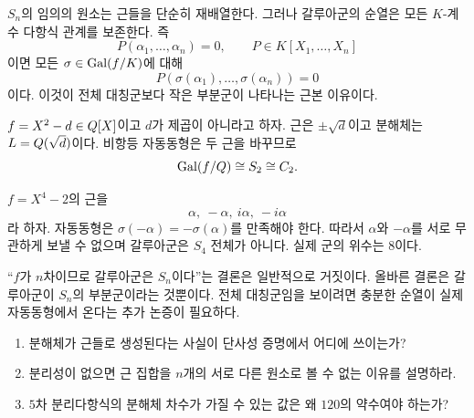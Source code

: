 \begin{remark}
$S_n$의 임의의 원소는 근들을 단순히 재배열한다. 그러나 갈루아군의 순열은 모든 $K$-계수 다항식 관계를 보존한다. 즉
\[
  P(\alpha_1,\dots,\alpha_n)=0,
  \qquad P\in K[X_1,\dots,X_n]
\]
이면 모든 $\sigma\in\operatorname{Gal}(f/K)$에 대해
\[
  P(\sigma(\alpha_1),\dots,\sigma(\alpha_n))=0
\]
이다. 이것이 전체 대칭군보다 작은 부분군이 나타나는 근본 이유이다.
\end{remark}

\begin{example}[이차방정식]
$f=X^2-d\in Q[X]$이고 $d$가 제곱이 아니라고 하자. 근은 $\pm\sqrt d$이고 분해체는 $L=Q(\sqrt d)$이다. 비항등 자동동형은 두 근을 바꾸므로
\[
  \operatorname{Gal}(f/Q)\cong S_2\cong C_2.
\]
\end{example}

\begin{example}
$f=X^4-2$의 근을
\[
  \alpha,\ -\alpha,\ i\alpha,\ -i\alpha
\]
라 하자. 자동동형은 $\sigma(-\alpha)=-\sigma(\alpha)$를 만족해야 한다. 따라서 $\alpha$와 $-\alpha$를 서로 무관하게 보낼 수 없으며 갈루아군은 $S_4$ 전체가 아니다. 실제 군의 위수는 $8$이다.
\end{example}

\begin{pitfall}
``$f$가 $n$차이므로 갈루아군은 $S_n$이다''는 결론은 일반적으로 거짓이다. 올바른 결론은 갈루아군이 $S_n$의 부분군이라는 것뿐이다. 전체 대칭군임을 보이려면 충분한 순열이 실제 자동동형에서 온다는 추가 논증이 필요하다.
\end{pitfall}

\begin{checkpoint}
\begin{enumerate}[label=(\alph*)]
  \item 분해체가 근들로 생성된다는 사실이 단사성 증명에서 어디에 쓰이는가?
  \item 분리성이 없으면 근 집합을 $n$개의 서로 다른 원소로 볼 수 없는 이유를 설명하라.
  \item $5$차 분리다항식의 분해체 차수가 가질 수 있는 값은 왜 $120$의 약수여야 하는가?
\end{enumerate}
\end{checkpoint}
